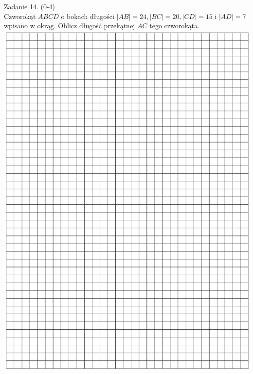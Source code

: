 \documentclass[10pt]{article}
\begin{document}
Zadanie 14. (0-4)\\
Czworokąt \(A B C D\) o bokach długości \(|A B|=24,|B C|=20,|C D|=15\) i \(|A D|=7\) wpisano w okrąg. Oblicz długość przekątnej \(A C\) tego czworokąta.\\
\includegraphics[max width=\textwidth, center]{2024_11_21_5229b9d0453456f1828dg-14}
\end{document}
